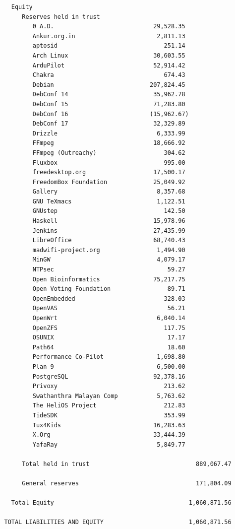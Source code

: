\documentclass[letterpaper]{report}
\begin{document}
\begin{verbatim}
     Equity
        Reserves held in trust
           0 A.D.                            29,528.35
           Ankur.org.in                       2,811.13
           aptosid                              251.14
           Arch Linux                        30,603.55
           ArduPilot                         52,914.42
           Chakra                               674.43
           Debian                           207,824.45
           DebConf 14                        35,962.78
           DebConf 15                        71,283.80
           DebConf 16                       (15,962.67)
           DebConf 17                        32,329.89
           Drizzle                            6,333.99
           FFmpeg                            18,666.92
           FFmpeg (Outreachy)                   304.62
           Fluxbox                              995.00
           freedesktop.org                   17,500.17
           FreedomBox Foundation             25,049.92
           Gallery                            8,357.68
           GNU TeXmacs                        1,122.51
           GNUstep                              142.50
           Haskell                           15,978.96
           Jenkins                           27,435.99
           LibreOffice                       68,740.43
           madwifi-project.org                1,494.90
           MinGW                              4,079.17
           NTPsec                                59.27
           Open Bioinformatics               75,217.75
           Open Voting Foundation                89.71
           OpenEmbedded                         328.03
           OpenVAS                               56.21
           OpenWrt                            6,040.14
           OpenZFS                              117.75
           OSUNIX                                17.17
           Path64                                18.60
           Performance Co-Pilot               1,698.80
           Plan 9                             6,500.00
           PostgreSQL                        92,378.16
           Privoxy                              213.62
           Swathanthra Malayan Comp           5,763.62
           The HeliOS Project                   212.83
           TideSDK                              353.99
           Tux4Kids                          16,283.63
           X.Org                             33,444.39
           YafaRay                            5,849.77

        Total held in trust                              889,067.47

        General reserves                                 171,804.09

     Total Equity                                      1,060,871.56

   TOTAL LIABILITIES AND EQUITY                        1,060,871.56
\end{verbatim}
\end{document}
